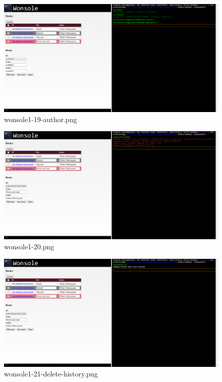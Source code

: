 \clearpage
\begin{figure}
\includegraphics[width=\textwidth]{screenshot/wonsole1-19-author.png}
\caption{wonsole1-19-author.png}
\label{wonsole1-19-author.png}
\end{figure}


\begin{figure}
\includegraphics[width=\textwidth]{screenshot/wonsole1-20.png}
\caption{wonsole1-20.png}
\label{wonsole1-20.png}
\end{figure}


\clearpage
\begin{figure}
\includegraphics[width=\textwidth]{screenshot/wonsole1-21-delete-history.png}
\caption{wonsole1-21-delete-history.png}
\label{wonsole1-21-delete-history.png}
\end{figure}


